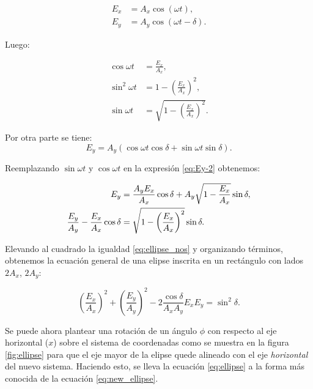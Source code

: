 \begin{align*}
E_x &= A_x\cos{ \left(\omega t \right)},\\
E_y &= A_y\cos{ \left(\omega t -\delta\right)}.
\end{align*}

Luego:

 \begin{align*}
\cos{\omega t} &=\frac{E_x}{A_x},\\
\sin^2{\omega t} &= 1-\left(\frac{E_x}{A_x}\right)^2,\\
\sin{\omega t} &= \sqrt{1-\left(\frac{E_x}{A_x}\right)^2}.
\end{align*}

Por otra parte se tiene:
\begin{equation}
  \label{eq:Ey-2}
E_y = A_y\left( \cos{\omega t}\cos{\delta}+\sin{\omega
    t}\sin{\delta}\right).  
\end{equation}


Reemplazando $\sin{\omega t} $ y $\cos{\omega t} $ en la expresión
\ref{eq:Ey-2} obtenemos:

\begin{align}
E_y &= \frac{A_yE_x}{A_x}\cos{\delta} +
A_y\sqrt{1-\frac{E_x}{A_x}}\sin{\delta},\notag\\
\frac{E_y}{A_y} - \frac{E_x}{A_x}\cos{\delta}  &= 
\sqrt{1-\left(\frac{E_x}{A_x}\right)^2}\sin{\delta}.\label{eq:ellipse_nos}
\end{align}

Elevando al cuadrado la igualdad \ref{eq:ellipse_nos} y organizando
términos, obtenemos la ecuación general de una elipse inscrita en un
rectángulo con lados $2A_x$, $2A_y$: 

\begin{equation}
\left(\frac{E_x}{A_x}\right)^2+\left(\frac{E_y}{A_y}\right)^2-2\frac{\cos{\delta}}{A_xA_y}E_xE_y
= \sin^2{\delta}.
\label{eq:ellipse}
\end{equation}

Se puede ahora plantear una rotación de un ángulo $\phi$ con respecto
al eje horizontal ($x$) sobre el sistema de coordenadas  como se
muestra en la figura \ref{fig:ellipse} para que
el eje mayor de la elipse quede alineado con el eje
\textit{horizontal} del nuevo sistema. Haciendo esto, se lleva la
ecuación \ref{eq:ellipse} a la forma más conocida de la ecuación
\ref{eq:new_ellipse}.

